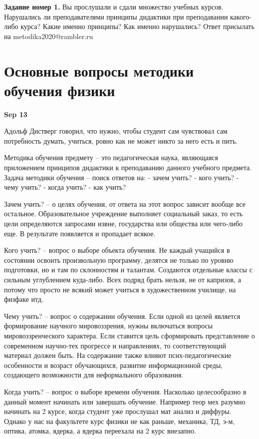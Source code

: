 \documentclass[a4paper, 12pt]{article}
\begin{document}
\textbf{Задание номер 1.} Вы прослушали и сдали множество учебных 
курсов. Нарушались ли преподавателями принципы дидактики при 
преподавании какого-либо курса? Какие именно принципы? Как именно 
нарушались? Ответ присылать на metodika2020@rambler.ru


\section{Основные вопросы методики обучения физики}

\hfill \textbf{Sep 13}

Адольф Дистверг говорил, что нужно, чтобы студент сам чувствовал сам 
потребность думать, учиться, ровно как не может никто за него есть 
и пить.

Методика обучения предмету -- это педагогическая наука, являющаяся 
приложением принципов дидактики к преподаванию данного учебного 
предмета. Задача методики обучения -- поиск ответов на:
- зачем учить?
- кого учить?
- чему учить?
- когда учить?
- как учить?

Зачем учить? -- о целях обучения, от ответа на этот вопрос зависит 
вообще все остальное. Образовательное учреждение выполняет социальный 
заказ, то есть цели определяются запросами извне, государства или 
общества или чего-либо еще. В результате появляется и пропадает всякое.

Кого учить? -- вопрос о выборе объекта обучения. Не каждый учащийся 
в состоянии освоить произвольную программу, делятся не только по уровню 
подготовки, но и там по склонностям и талантам. Создаются отдельные 
классы с сильным углублением куда-либо. Всех подряд брать нельзя, не от 
капризов, а потому что просто не всякий может учиться в художественном 
училище, на физфаке итд.

Чему учить? -- вопрос о содержании обучения. Если одной из целей 
является формирование научного мировоззрения, нужны включаться вопросы 
мировоззренческого характера. Если ставится цель сформировать 
представление о современном научно-тех прогрессе и направлениях, то 
соответствующий материал должен быть. На содержание также влияют 
псих-педагогические особенности и возраст обучающихся, развитие 
информационной среды, создающего возможности для неформального 
образования.

Когда учить? -- вопрос о выборе времени обучения. Насколько 
целесообразно в данный момент начинать или завершать обучение. Например 
теор мех разумно начинать на 2 курсе, когда студент уже прослушал мат 
анализ и диффуры. Однако у нас на факультете курс физики не как раньше, 
механика, ТД, э-м, оптика, атомка, ядерка, а ядерка переехала на 2 курс 
внезапно.
\end{document}
